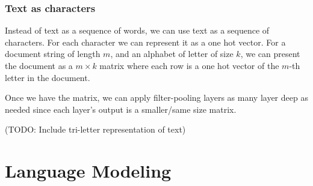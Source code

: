 \documentclass[twocolumn, 10pt]{article}
\begin{document}
\subsubsection*{Text as characters}
Instead of text as a sequence of words, we can use text as a sequence of characters. For each character we can represent it as a one hot vector. For a document string of length $m$, and an alphabet of letter of size $k$,  we can present the document as a  $m \times k$ matrix where each row is a one hot vector of the $m$-th letter in the document.

Once we have the matrix, we can apply filter-pooling layers as many layer deep as needed since each layer's output is a smaller/same size matrix. 

(TODO: Include tri-letter representation of text)

\section{Language Modeling}
\end{document}
